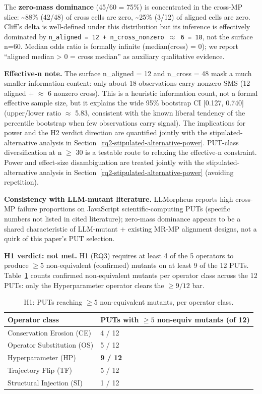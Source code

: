 \documentclass[12pt]{article}
\begin{document}
The \textbf{zero-mass dominance} (45/60 = 75\%) is concentrated in the
cross-MP slice: \textasciitilde88\% (42/48) of cross cells are zero,
\textasciitilde25\% (3/12) of aligned cells are zero. Cliff's delta is
well-defined under this distribution but its inference is effectively
dominated by
\texttt{n\_aligned\ =\ 12\ +\ n\_cross\_nonzero\ $\approx$\ 6\ =\ 18}, not the
surface n=60. Median odds ratio is formally infinite (median(cross) =
0); we report ``aligned median \textgreater{} 0 = cross median'' as
auxiliary qualitative evidence.

\textbf{Effective-n note.} The surface n\_aligned = 12 and n\_cross = 48
mask a much smaller information content: only about 18 observations carry
nonzero SMS (12 aligned + $\approx$ 6 nonzero cross). This is a heuristic
information count, not a formal effective sample size, but it explains the
wide 95\% bootstrap CI {[}0.127, 0.740{]} (upper/lower ratio $\approx$
5.83, consistent with the known liberal tendency of the percentile
bootstrap when few observations carry signal). The implications for power and the H2 verdict direction are
quantified jointly with the stipulated-alternative analysis in Section~\ref{rq2-stipulated-alternative-power}.
PUT-class diversification at n $\geq$ 30 is a testable route to relaxing
the effective-n constraint. Power and effect-size disambiguation are
treated jointly with the stipulated-alternative analysis in Section~\ref{rq2-stipulated-alternative-power}
(avoiding repetition).

\textbf{Consistency with LLM-mutant literature.} \citet{tip2025llmorpheus}
LLMorpheus reports high cross-MP failure proportions on JavaScript
scientific-computing PUTs (specific numbers not listed in cited
literature); zero-mass dominance appears to be a shared characteristic
of LLM-mutant + existing MR-MP alignment designs, not a quirk of this
paper's PUT selection.

\textbf{H1 verdict: not met.} H1 (RQ3) requires at least 4 of the 5
operators to produce $\geq 5$ non-equivalent (confirmed) mutants on at
least 9 of the 12 PUTs. Table~\ref{tab:p2-32} counts confirmed
non-equivalent mutants per operator class across the 12 PUTs: only the
Hyperparameter operator clears the $\geq 9/12$ bar.

{\def\LTcaptype{table} %
\begin{longtable}[]{@{}ll@{}}
\caption{H1: PUTs reaching $\geq 5$ non-equivalent mutants, per operator
class.}\label{tab:p2-32}\\
\toprule\noalign{}
Operator class & PUTs with $\geq 5$ non-equiv mutants (of 12) \\
\midrule\noalign{}
\endfirsthead
\endhead
\bottomrule\noalign{}
\endlastfoot
Conservation Erosion (CE) & 4 / 12 \\
Operator Substitution (OS) & 5 / 12 \\
Hyperparameter (HP) & \textbf{9 / 12} \\
Trajectory Flip (TF) & 5 / 12 \\
Structural Injection (SI) & 1 / 12 \\
\end{longtable}
}
\end{document}
